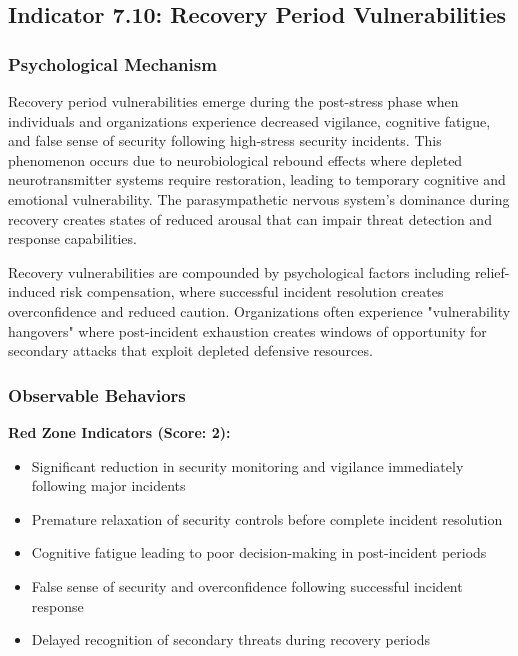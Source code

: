 \documentclass[11pt,a4paper]{article}
\begin{document}
\subsection{Indicator 7.10: Recovery Period Vulnerabilities}

\subsubsection{Psychological Mechanism}

Recovery period vulnerabilities emerge during the post-stress phase when individuals and organizations experience decreased vigilance, cognitive fatigue, and false sense of security following high-stress security incidents\cite{recovery2023}. This phenomenon occurs due to neurobiological rebound effects where depleted neurotransmitter systems require restoration, leading to temporary cognitive and emotional vulnerability\cite{neurotransmitter2022}. The parasympathetic nervous system's dominance during recovery creates states of reduced arousal that can impair threat detection and response capabilities\cite{parasympathetic2021}.

Recovery vulnerabilities are compounded by psychological factors including relief-induced risk compensation, where successful incident resolution creates overconfidence and reduced caution\cite{riskcompensation2022}. Organizations often experience "vulnerability hangovers" where post-incident exhaustion creates windows of opportunity for secondary attacks that exploit depleted defensive resources\cite{hangover2023}.

\subsubsection{Observable Behaviors}

\textbf{Red Zone Indicators (Score: 2):}
\begin{itemize}
\item Significant reduction in security monitoring and vigilance immediately following major incidents
\item Premature relaxation of security controls before complete incident resolution
\item Cognitive fatigue leading to poor decision-making in post-incident periods
\item False sense of security and overconfidence following successful incident response
\item Delayed recognition of secondary threats during recovery periods
\end{itemize}
\end{document}
